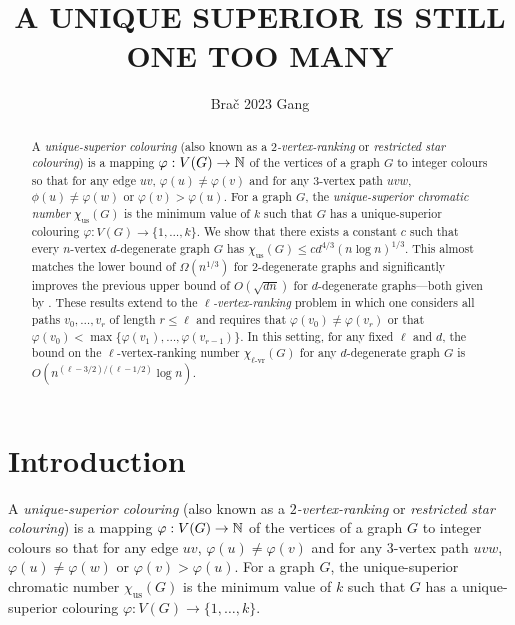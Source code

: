 \documentclass{patmorin}
\title{\MakeUppercase{A Unique Superior is Still One Too Many}}
\author{Bra\v{c} 2023 Gang}
\newcommand{\defin}[1]{\emph{\color{brightmaroon}#1}}
\newcommand{\rn}[1]{\chi_{\operatorname{#1-vr}}}
\newcommand{\trn}{\chi_{\mathrm{us}}}
\newcommand{\lrn}{\rn{\ell}}
\begin{document}
\maketitle

\begin{abstract}
  A \defin{unique-superior colouring} (also known as a \defin{$2$-vertex-ranking} or \defin{restricted star colouring}) is a mapping $\varphi:V(G)\to\mathbb{N}$ of the vertices of a graph $G$ to integer colours so that for any edge $uv$, $\varphi(u)\neq \varphi(v)$ and for any $3$-vertex path $uvw$, $\phi(u)\neq\varphi(w)$ or $\varphi(v)>\varphi(u)$.  For a graph $G$, the \defin{unique-superior chromatic number} $\trn(G)$ is the minimum value of $k$ such that $G$ has a unique-superior colouring $\varphi:V(G)\to\{1,\ldots,k\}$.  We show that there exists a constant $c$ such that every $n$-vertex $d$-degenerate graph $G$ has $\trn(G) \le cd^{4/3}(n\log n)^{1/3}$.  This almost matches the lower bound of $\Omega(n^{1/3})$ for $2$-degenerate graphs and significantly improves the previous upper bound of $O(\sqrt{dn})$ for $d$-degenerate graphs---both given by \citet{karpas.neiman.ea:on}. These results extend to the \defin{$\ell$-vertex-ranking} problem in which one considers all paths $v_0,\ldots,v_r$ of length $r\le \ell$ and requires that $\varphi(v_0)\neq\varphi(v_r)$ or that $\varphi(v_0)<\max\{\varphi(v_1),\ldots,\varphi(v_{r-1})\}$.  In this setting, for any fixed $\ell$ and $d$, the bound on the $\ell$-vertex-ranking number $\lrn(G)$ for any $d$-degenerate graph $G$ is $O(n^{(\ell-3/2)/(\ell-1/2)}\log n)$.
\end{abstract}


%



\section{Introduction}

A \defin{unique-superior colouring} (also known as a \defin{$2$-vertex-ranking} or \defin{restricted star colouring}) is a mapping $\varphi:V(G)\to\mathbb{N}$ of the vertices of a graph $G$ to integer colours so that for any edge $uv$, $\varphi(u)\neq \varphi(v)$ and for any $3$-vertex path $uvw$, $\varphi(u)\neq\varphi(w)$ or $\varphi(v)>\varphi(u)$.  For a graph $G$, the unique-superior chromatic number $\trn(G)$ is the minimum value of $k$ such that $G$ has a unique-superior colouring $\varphi:V(G)\to\{1,\ldots,k\}$.
\end{document}
